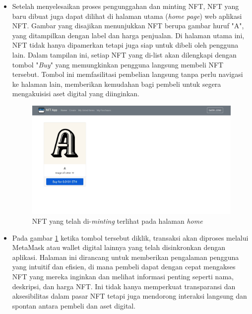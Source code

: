 \begin{itemize}
      \item Setelah menyelesaikan proses pengunggahan dan minting NFT, NFT yang baru dibuat juga dapat dilihat di halaman utama (\emph{home page}) web aplikasi NFT. Gambar yang disajikan menunjukkan NFT berupa gambar huruf "A", yang ditampilkan dengan label dan harga penjualan. Di halaman utama ini, NFT tidak hanya dipamerkan tetapi juga siap untuk dibeli oleh pengguna lain. Dalam tampilan ini, setiap NFT yang di-list akan dilengkapi dengan tombol "\emph{Buy}" yang memungkinkan pengguna langsung membeli NFT tersebut. Tombol ini memfasilitasi pembelian langsung tanpa perlu navigasi ke halaman lain, memberikan kemudahan bagi pembeli untuk segera mengakuisisi aset digital yang diinginkan. 
      

      \begin{figure} [H] \centering
        \includegraphics[scale=0.26]{gambar/nft_listed_home.jpg}
        \caption{NFT yang telah di-\emph{minting} terlihat pada halaman \emph{home}}
        \label{fig:listhome}
        \end{figure}


      \item Pada gambar \ref{fig:listhome} ketika tombol tersebut diklik, transaksi akan diproses melalui MetaMask atau wallet digital lainnya yang telah disinkronkan dengan aplikasi. Halaman ini dirancang untuk memberikan pengalaman pengguna yang intuitif dan efisien, di mana pembeli dapat dengan cepat mengakses NFT yang mereka inginkan dan melihat informasi penting seperti nama, deskripsi, dan harga NFT. Ini tidak hanya memperkuat transparansi dan aksesibilitas dalam pasar NFT tetapi juga mendorong interaksi langsung dan spontan antara pembeli dan aset digital.

\end{itemize}